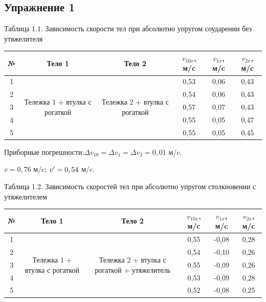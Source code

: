 \documentclass[12pt]{article}
\begin{document}
\subsection*{Упражнение 1}
\begin{center}
Таблица 1.1. Зависимость скорости тел при абсолютно упругом соударении без утяжелителя 
\begin{table}[h!]
\begin{center}
\begin{tabular}{|c|c|c|c|c|c|}
\hline
 № & Тело 1 & Тело 2 & $v_{10x}$, м/c & $v_{1x}$, м/c & $v_{2x}$, м/c \\
\hline
 1 &\multirow{5}{60pt}{Тележка 1 + втулка с рогаткой}    & \multirow{5}{60pt}{Тележка 2 + втулка с рогаткой} & 0,53&	0,06	&0,43 \\
\hhline{-~~---}

 2 &    &  & 0,54&	0,06	&0,43 \\
\hhline{-~~---}
 3 &   &  & 0,57&	0,07&	0,43 \\
\hhline{-~~---}
 4 &  &  &0,55	&0,05&	0,47 \\
\hhline{-~~---}
 5 &    &  & 0,55&	0,05&	0,45 \\
\hline
\end{tabular}

Приборные погрешности:$\Delta v_{10}=\Delta v_{1}=\Delta v_{2} = 0,01$ м/c. 

$v=0,76$ м/c; $v\rq{} =0,54$ м/c.
\end{center}
\end{table} 

Таблица 1.2. Зависимость скоростей тел при абсолютно упругом столкновении с утяжелителем
\begin{table}[h!]
\begin{center}
\begin{tabular}{|c|c|c|c|c|c|}
\hline
 № & Тело 1 & Тело 2 & $v_{10x}$, м/c & $v_{1x}$, м/c & $v_{2x}$, м/c \\
\hline
 1 &\multirow{5}{70pt}{Тележка 1 + втулка с рогаткой}    & \multirow{5}{70pt}{Тележка 2 + втулка с рогаткой + утяжелитель} & 0,55&	-0,08&	0,28 \\
\hhline{-~~---}

 2 &    &  & 0,54&	-0,10&	0,26 \\
\hhline{-~~---}
 3 &   &  &0,55	&-0,09	&0,26 \\
\hhline{-~~---}
 4 &  &  &0,53&	-0,09	&0,28 \\
\hhline{-~~---}
 5 &    &  & 0,52&	-0,08	&0,25 \\
\hline
\end{tabular}
\end{center}
\end{table}


\end{center}
\end{document}
